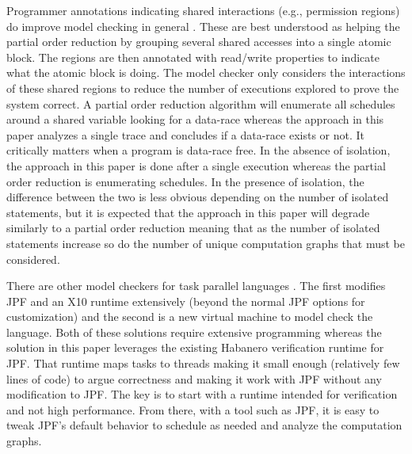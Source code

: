 Programmer annotations indicating shared interactions (e.g., permission regions) do improve model checking in general \cite{westbrook2012practical, westbrook2012permission}. These are best understood as helping the partial order reduction by grouping several shared accesses into a single atomic block. The regions are then annotated with read/write properties to indicate what the atomic block is doing. The model checker only considers the interactions of these shared regions to reduce the number of executions explored to prove the system correct.  A partial order reduction algorithm will enumerate all schedules around a shared variable looking for a data-race whereas the approach in this paper analyzes a single trace and concludes if a data-race exists or not. It critically matters when a program is data-race free. In the absence of isolation, the approach in this paper is done after a single execution whereas the partial order reduction is enumerating schedules. In the presence of isolation, the difference between the two is less obvious depending on the number of isolated statements, but it is expected that the approach in this paper will degrade similarly to a partial order reduction meaning that as the number of isolated statements increase so do the number of unique computation graphs that must be considered. 

There are other model checkers for task parallel languages \cite{gligoric2012x10x,zirkel2013automated}. The first modifies JPF and an X10 runtime extensively (beyond the normal JPF options for customization) and the second is a new virtual machine to model check the language. Both of these solutions require extensive programming whereas the solution in this paper leverages the existing Habanero verification runtime for JPF. That runtime maps tasks to threads making it small enough (relatively few lines of code) to argue correctness and making it work with JPF without any modification to JPF. The key is to start with a runtime intended for verification and not high performance. From there, with a tool such as JPF, it is easy to tweak JPF's default behavior to schedule as needed and analyze the computation graphs. 


